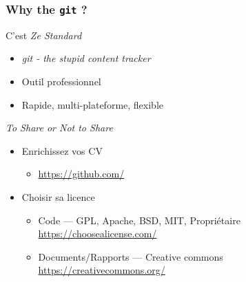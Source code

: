 \documentclass[table,tikz,12pt,svgnames]{beamer}
\begin{document}
\begin{frame}
\frametitle{Why the \texttt{git} ?}
\begin{block}{C'est \textit{Ze Standard}}
	\begin{itemize}
		\item \textit{git - the stupid content tracker}
		\item Outil professionnel
		\item Rapide, multi-plateforme, flexible
	\end{itemize}
\end{block}
\begin{block}{\textit{To Share or Not to Share}}
	\begin{itemize}
		\item Enrichissez vos CV
		\begin{itemize}
			\item \url{https://github.com/}
		\end{itemize}
		\item Choisir sa licence
		\begin{itemize}
			\item Code --- GPL, Apache, BSD, MIT, Propriétaire \url{https://choosealicense.com/}
			\item Documents/Rapports --- Creative commons \url{https://creativecommons.org/}
		\end{itemize}
	\end{itemize}
\end{block}
\end{frame}



\end{document}
